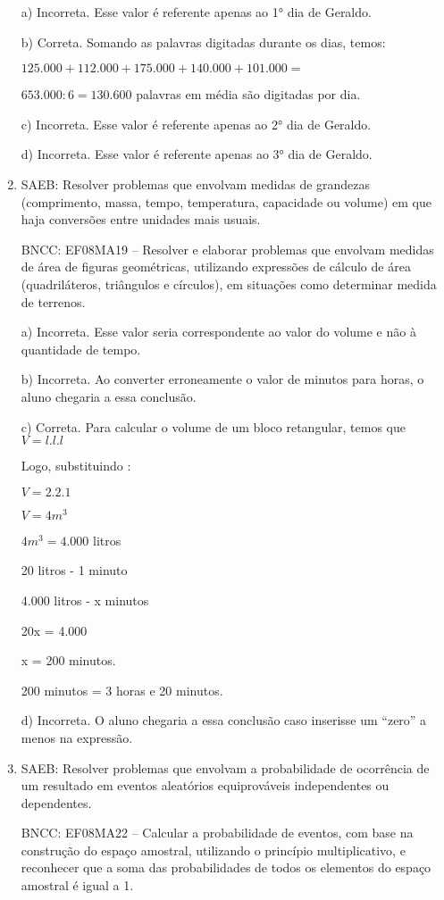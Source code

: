 \begin{enumerate}
a) Incorreta. Esse valor é referente apenas ao 1° dia de Geraldo.

b) Correta. Somando as palavras digitadas durante os dias, temos:

$125.000 + 112.000 + 175.000 + 140.000 + 101.000 =$
 
 $653.000 : 6 = 130.600$ palavras em média são digitadas por dia.

c) Incorreta. Esse valor é referente apenas ao 2° dia de Geraldo.

d) Incorreta. Esse valor é referente apenas ao 3° dia de Geraldo.

\item SAEB: Resolver problemas que envolvam medidas de grandezas (comprimento,
massa, tempo, temperatura, capacidade ou volume) em que haja conversões
entre unidades mais usuais.

BNCC: EF08MA19 -- Resolver e elaborar problemas que envolvam medidas de
área de figuras geométricas, utilizando expressões de cálculo de área
(quadriláteros, triângulos e círculos), em situações como determinar
medida de terrenos.

a) Incorreta. Esse valor seria correspondente ao valor do volume e
não à quantidade de tempo.

b) Incorreta. Ao converter erroneamente o valor de minutos para
horas, o aluno chegaria a essa conclusão.

c) Correta. Para calcular o volume de um bloco retangular, temos
que $V = l.l.l$

Logo, substituindo :

$V= 2.2.1$

$V=4 m^3$

$4m^3 = 4.000$ litros

20 litros - 1 minuto

4.000 litros - x minutos

20x = 4.000
 
x = 200 minutos.

200 minutos = 3 horas e 20 minutos.

d) Incorreta. O aluno chegaria a essa conclusão caso inserisse um
``zero'' a menos na expressão.

\item SAEB: Resolver problemas que envolvam a probabilidade de ocorrência de
um resultado em eventos aleatórios equiprováveis independentes ou
dependentes.

BNCC: EF08MA22 -- Calcular a probabilidade de eventos, com base na
construção do espaço amostral, utilizando o princípio multiplicativo, e
reconhecer que a soma das probabilidades de todos os elementos do espaço
amostral é igual a 1.


\end{enumerate}
